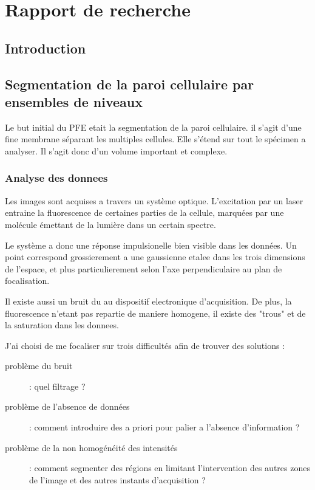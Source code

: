 

\chapter{Rapport de recherche} 

\section{Introduction}


  
 
\section{Segmentation de la paroi cellulaire par ensembles de niveaux}

Le but initial du PFE etait la segmentation de la paroi cellulaire. il s'agit d'une fine membrane séparant les multiples cellules. Elle s'étend sur tout le spécimen a analyser. Il s'agit donc d'un volume important et complexe.

\subsection{Analyse des donnees}
Les images sont acquises a travers un système optique. L'excitation par un laser entraine la fluorescence de certaines parties de la cellule, marquées par une molécule émettant de la lumière dans un certain spectre.

Le système a donc une réponse impulsionelle bien visible dans les données. Un point correspond grossierement a une gaussienne etalee dans les trois dimensions de l'espace, et plus particulierement selon l'axe perpendiculaire au plan de focalisation.

Il existe aussi un bruit du au dispositif electronique d'acquisition. De plus, la fluorescence n'etant pas repartie de maniere homogene, il existe des "trous" et de la saturation dans les donnees.

J'ai choisi de me focaliser sur trois difficultés afin de trouver des solutions :
\begin{description}
  \item [problème du bruit] : quel filtrage ?
  \item [problème de l'absence de données] : comment introduire des a priori pour palier a l'absence d'information ?
  \item [problème de la non homogénéité des intensités]  : comment segmenter des régions en limitant l'intervention des autres zones de l'image et des autres instants d'acquisition ?
\end{description}


